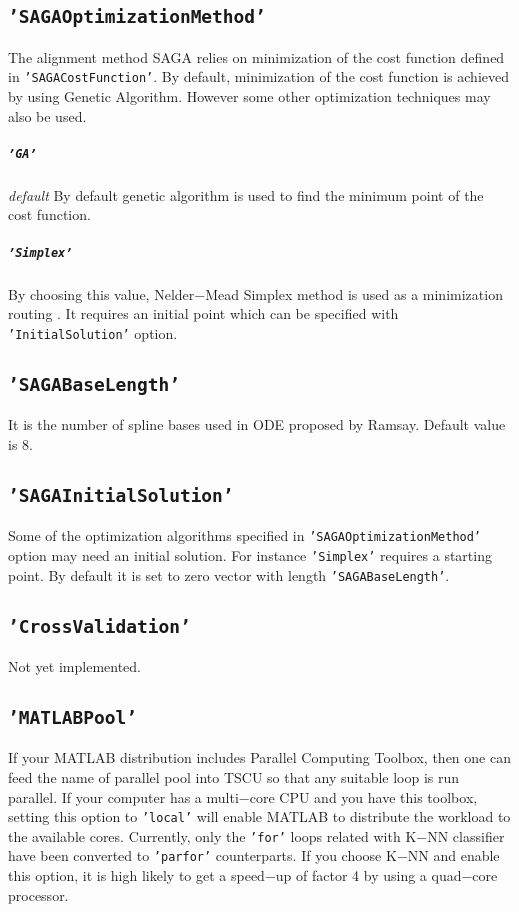 \documentclass{article}
\newcommand{\parametre}[1]{\texttt{#1}}
\begin{document}
\subsection{\parametre{'SAGAOptimizationMethod'}}
The alignment method SAGA relies on minimization of the cost function defined in \parametre{'SAGACostFunction'}. By default, minimization of the cost function is achieved by using Genetic Algorithm. However some other optimization techniques may also be used.

\subparagraph*{\parametre{'GA'}} \textit{default} 
By default genetic algorithm is used to find the minimum point of the cost function.

\subparagraph*{\parametre{'Simplex'}} By choosing this value, Nelder$-$Mead Simplex method is used as a minimization routing \cite{Lagarias1998}. It requires an initial point which can be specified with \parametre{'InitialSolution'} option.

\subsection{\parametre{'SAGABaseLength'}} 
It is the number of spline bases used in ODE proposed by Ramsay. Default value is $8$.

\subsection{\parametre{'SAGAInitialSolution'}}
Some of the optimization algorithms specified in \parametre{'SAGAOptimizationMethod'} option may need an initial solution. For instance \parametre{'Simplex'} requires a starting point. By default it is set to zero vector with length \parametre{'SAGABaseLength'}.

\subsection{\parametre{'CrossValidation'}}
Not yet implemented.

\subsection{\parametre{'MATLABPool'}}
If your MATLAB distribution includes Parallel Computing Toolbox, then one can feed the name of parallel pool into TSCU so that any suitable loop is run parallel. If your computer has a multi$-$core CPU and you have this toolbox, setting this option to \parametre{'local'} will enable MATLAB to distribute the workload to the available cores. Currently, only the \parametre{'for'} loops related with K$-$NN classifier have been converted to \parametre{'parfor'} counterparts. If you choose K$-$NN and enable this option, it is high likely to get a speed$-$up of factor 4 by using a quad$-$core processor.
\end{document}
